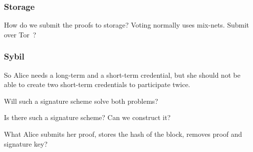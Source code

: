 \subsubsection{Storage}

\begin{frame}
  \begin{question}
    How do we submit the proofs to storage?
    Voting normally uses mix-nets.
    Submit over Tor~\cite{Tor}?
  \end{question}

\end{frame}

\subsubsection{Sybil}

So Alice needs a long-term and a short-term credential, but she should not be 
able to create two short-term credentials to participate twice.

\begin{frame}
  \begin{question}
    Will such a signature scheme solve both problems?
  \end{question}
  \begin{question}
    Is there such a signature scheme?
    Can we construct it?
  \end{question}
  \begin{question}
    What Alice submits her proof, stores the hash of the block, removes proof 
    and signature key?
  \end{question}
\end{frame}


